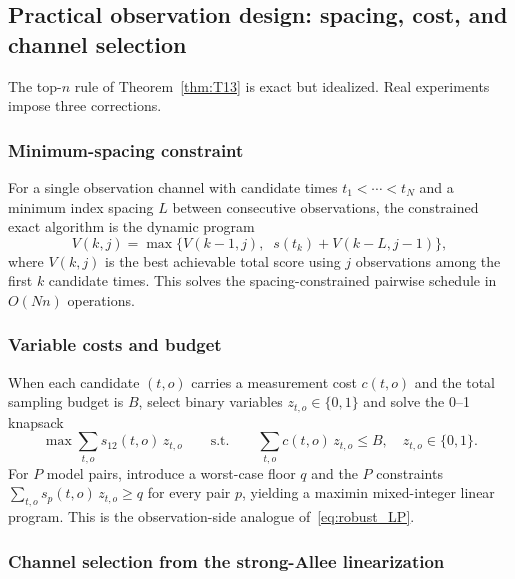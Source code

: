 \subsection{Practical observation design: spacing, cost, and channel selection}
\label{sec:practical_obs}

The top-\(n\) rule of Theorem~\ref{thm:T13} is exact but idealized. Real experiments impose three corrections.

\subsubsection*{Minimum-spacing constraint}

For a single observation channel with candidate times \(t_1 < \cdots < t_N\) and a minimum index spacing \(L\) between consecutive observations, the constrained exact algorithm is the dynamic program
\begin{equation}
V(k, j) = \max\bigl\{ V(k-1, j),\;\; s(t_k) + V(k - L, j - 1) \bigr\},
\label{eq:dp_spacing}
\end{equation}
where \(V(k, j)\) is the best achievable total score using \(j\) observations among the first \(k\) candidate times. This solves the spacing-constrained pairwise schedule in \(O(N n)\) operations.

\subsubsection*{Variable costs and budget}

When each candidate \((t, o)\) carries a measurement cost \(c(t, o)\) and the total sampling budget is \(B\), select binary variables \(z_{t,o} \in \{0, 1\}\) and solve the 0--1 knapsack
\begin{equation}
\max \sum_{t, o} s_{12}(t, o)\, z_{t, o}
\qquad\text{s.t.}\qquad
\sum_{t, o} c(t, o)\, z_{t, o} \le B,\quad z_{t, o} \in \{0, 1\}.
\label{eq:knapsack}
\end{equation}
For \(P\) model pairs, introduce a worst-case floor \(q\) and the \(P\) constraints \(\sum_{t, o} s_p(t, o)\, z_{t, o} \ge q\) for every pair \(p\), yielding a maximin mixed-integer linear program. This is the observation-side analogue of~\eqref{eq:robust_LP}.

\subsubsection*{Channel selection from the strong-Allee linearization}

